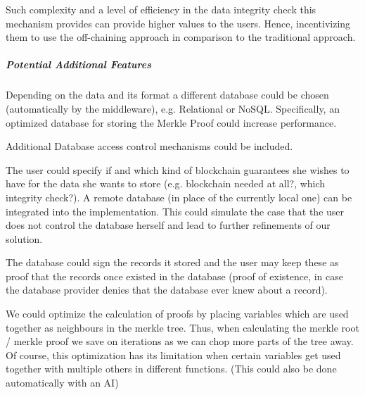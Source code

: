Such complexity and a level of efficiency in the data integrity check this mechanism provides can provide higher values to the users. Hence, incentivizing them to use the off-chaining approach in comparison to the traditional approach.

\subparagraph{Potential Additional Features}
Depending on the data and its format a different database could be chosen (automatically by the middleware), e.g. Relational or NoSQL. Specifically, an optimized database for storing the Merkle Proof could increase performance.

Additional Database access control mechanisms could be included.

The user could specify if and which kind of blockchain guarantees she wishes to have for the data she wants to store (e.g. blockchain needed at all?, which integrity check?).
A remote database (in place of the currently local one) can be integrated into the implementation. This could simulate the case that the user does not control the database herself and lead to further refinements of our solution.

The database could sign the records it stored and the user may keep these as proof that the records once existed in the database (proof of existence, in case the database provider denies that the database ever knew about a record). \cite{Eberhardt}

We could optimize the calculation of proofs by placing variables which are used together as neighbours in the merkle tree. Thus, when calculating the merkle root / merkle proof we save on iterations as we can chop more parts of the tree away. Of course, this optimization has its limitation when certain variables get used together with multiple others in different functions. (This could also be done automatically with an AI)
